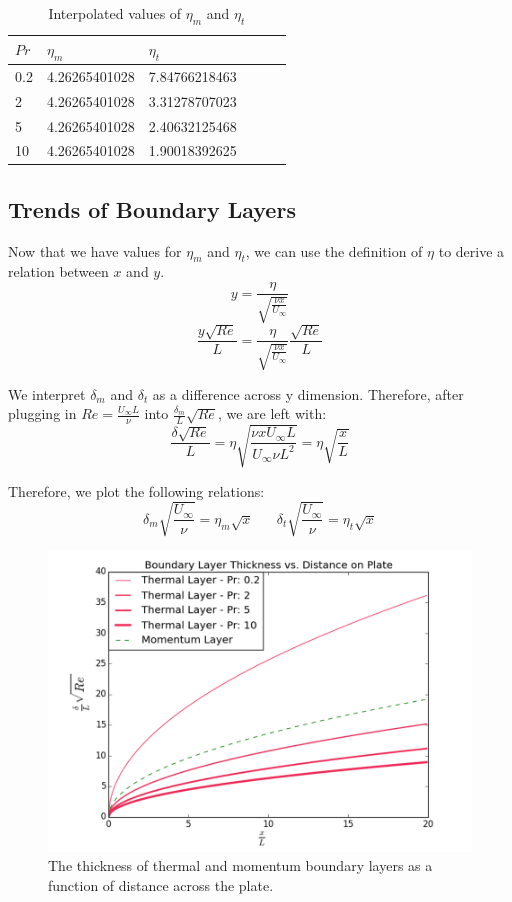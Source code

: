 \documentclass[12pt]{article}\pagestyle{myheadings}
\theoremstyle{plain}
\begin{document}
\begin{table}[ht!]
\centering
\begin{tabular} {| l | l | l | l | l | l |}
\hline
$Pr$ & $\eta_{m}$ & $\eta_{t}$ \\
\hline
0.2 & 4.26265401028 & 7.84766218463 \\
2 & 4.26265401028 & 3.31278707023 \\
5 & 4.26265401028 & 2.40632125468 \\
10 & 4.26265401028 & 1.90018392625 \\
\hline
\end{tabular}
\caption{Interpolated values of $\eta_{m}$ and $\eta_{t}$}
\end{table}

\subsection{Trends of Boundary Layers}
Now that we have values for $\eta_{m}$ and $\eta_{t}$, we can use the definition of $\eta$ to derive a relation between $x$ and $y$. \\
$$y = \frac{\eta}{\sqrt{\frac{\nu x}{U_{\infty}}}} $$
$$\frac{y\sqrt{Re}}{L} = \frac{\eta}{\sqrt{\frac{\nu x}{U_{\infty}}}} \frac{\sqrt{Re}}{L}$$

We interpret $\delta_m$ and $\delta_t$ as a difference across y dimension. Therefore, after plugging in $Re = \frac{U_{\infty}L}{\nu} $ into $\frac{\delta_m}{L}\sqrt{Re} $, we are left with: \\

$$\frac{\delta \sqrt{Re}}{L} =  \eta{\sqrt{\frac{\nu x U_{\infty} L}{U_{\infty} \nu L^2}}} = \eta \sqrt{\frac{x}{L}}$$

Therefore, we plot the following relations:
\[\delta_m \sqrt{\frac{U_{\infty}}{\nu}} = \eta_m \sqrt{x}  \,\,\,\,\,\,\,\,\,\,  \delta_t \sqrt{\frac{U_{\infty}}{\nu}} = \eta_t \sqrt{x}\]

\begin{figure}[h]
\centering
\includegraphics[scale=0.75]{part5.png}
\caption{The thickness of thermal and momentum boundary layers as a function of distance across the plate.}
\label{fig:boundaryLayers}
\end{figure}
\end{document}
